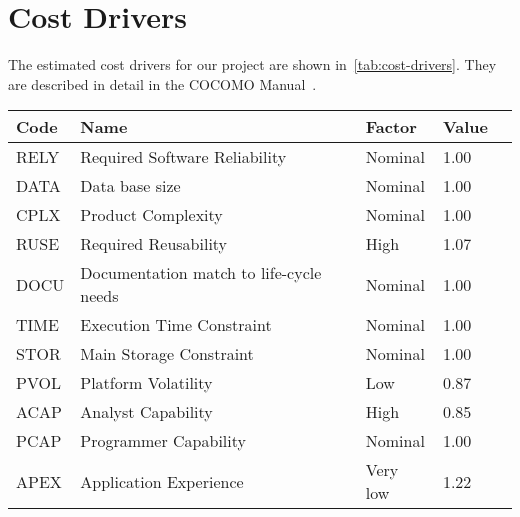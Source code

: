 \section{Cost Drivers}

The estimated cost drivers for our project are shown in~\autoref{tab:cost-drivers}.
They are described in detail in the COCOMO Manual~\cite[p.~25]{cocomo-manual}.

\begin{table}[h]
    \centering
    \begin{tabular}{| l | l | l | l | l |}
        \hline
        \textbf{Code}   & \textbf{Name}                             & \textbf{Factor}      & \textbf{Value}    \\
        \hline
        RELY            & Required Software Reliability             & Nominal              & 1.00              \\
        \hline
        DATA            & Data base size                            & Nominal              & 1.00              \\
        \hline
        CPLX            & Product Complexity                        & Nominal              & 1.00              \\
        \hline
        RUSE            & Required Reusability                      & High                 & 1.07              \\
        \hline
        DOCU            & Documentation match to life-cycle needs   & Nominal              & 1.00              \\
        \hline
        TIME            & Execution Time Constraint                 & Nominal              & 1.00              \\
        \hline
        STOR            & Main Storage Constraint                   & Nominal              & 1.00              \\
        \hline
        PVOL            & Platform Volatility                       & Low                  & 0.87              \\
        \hline
        ACAP            & Analyst Capability                        & High                 & 0.85              \\
        \hline
        PCAP            & Programmer Capability                     & Nominal              & 1.00              \\
        \hline
        APEX            & Application Experience                    & Very low             & 1.22              \\

\end{tabular}
\end{table}
